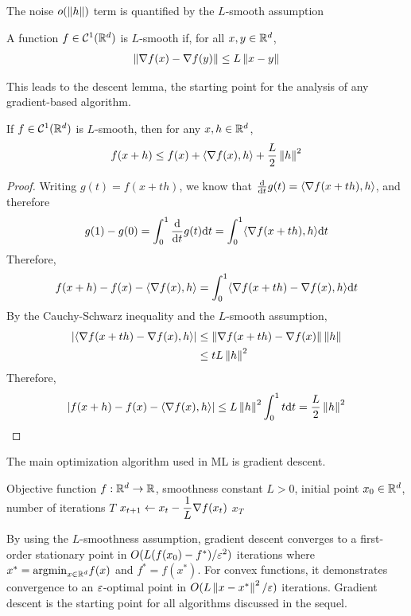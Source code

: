 The noise $o(\left\lVert h \right\rVert)$ term is quantified by the $L$-smooth assumption
\begin{definition}
    A function $f \in \mathcal C^1(\mathbb{R}^d)$ is $L$-smooth if, for all $x,y \in \mathbb{R}^d$,
    \begin{align*}
        \left\lVert \nabla f(x) - \nabla f(y) \right\rVert \leq L \left\lVert x-y \right\rVert
    \end{align*}
\end{definition}
This leads to the descent lemma, the starting point for the analysis of any gradient-based algorithm.
\begin{lemma}
    \label{lem:descent-lemma}
    If $f \in \mathcal C^1(\mathbb{R}^d)$ is $L$-smooth, then for any $x, h \in \mathbb{R}^d$,
    \begin{align*}
        f(x+h) \leq f(x) + \langle \nabla f(x), h \rangle + \frac{L}{2}\left\lVert h \right\rVert^2
    \end{align*}
\end{lemma}
\begin{proof}
    Writing $g(t) = f(x+th)$, we know that $\dv{t} g(t) = \langle \nabla f(x+th), h \rangle$, and therefore
    \begin{align*}
        g(1) - g(0) = \int_0^1 \dv{t} g(t)\dd t = \int_{0}^1 \langle \nabla f(x+th), h \rangle \dd t
    \end{align*}
    Therefore,
    \begin{align*}
        f(x+h) - f(x) - \langle \nabla f(x),h\rangle = \int_{0}^1 \langle \nabla f(x+th) - \nabla f(x), h \rangle \dd t
    \end{align*}
    By the Cauchy-Schwarz inequality and the $L$-smooth assumption,
    \begin{align*}
        |\langle \nabla f(x+th) - \nabla f(x), h \rangle| &\leq \left\lVert \nabla f(x+th) - \nabla f(x) \right\rVert \left\lVert h \right\rVert \\
        &\leq tL\left\lVert h \right\rVert^2
    \end{align*}
    Therefore,
    \begin{align*}
        |f(x+h) - f(x) - \langle \nabla f(x),h\rangle| \leq L \left\lVert h \right\rVert^2 \int_{0}^1 t \dd t = \frac{L}{2} \left\lVert h \right\rVert^2
    \end{align*}
\end{proof}
The main optimization algorithm used in ML is gradient descent.
\begin{algorithm}[H]
\caption{Gradient Descent}
\label{alg:gradient-descent}
\begin{algorithmic}[1]
    \Require Objective function $f:\mathbb{R}^d\to\mathbb{R}$, smoothness constant $L>0$,
    initial point $x_0\in\mathbb{R}^d$, number of iterations $T$
        \State $x_{t+1} \gets x_t-\dfrac{1}{L}\nabla f(x_t)$
    \EndFor
    \State \Return $x_T$
\end{algorithmic}
\end{algorithm}
By using the $L$-smoothness assumption, gradient descent converges to a first-order stationary point in $O(L (f(x_0) - f^*)/\varepsilon^2)$ iterations where $x^* = \mathrm{argmin}_{x \in \mathbb{R}^d} f(x)$ and $f^* = f(x^*)$. For convex functions, it demonstrates convergence to an $\varepsilon$-optimal point in $O(L\left\lVert x-x^* \right\rVert^2/\varepsilon)$ iterations. Gradient descent is the starting point for all algorithms discussed in the sequel.

